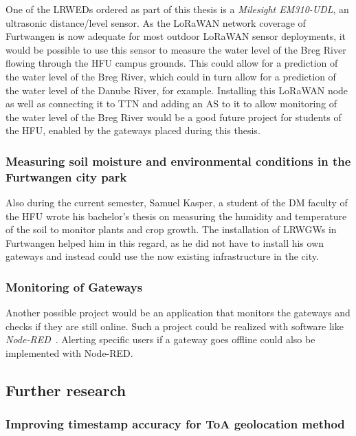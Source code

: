 One of the \aclp{LRWED} ordered as part of this thesis is a \emph{Milesight EM310-UDL}, an ultrasonic distance/level sensor.
As the \ac{LoRaWAN} network coverage of Furtwangen is now adequate for most outdoor \ac{LoRaWAN} sensor deployments, it would be possible to use this sensor to measure the water level of the Breg River flowing through the \ac{HFU} campus grounds.
This could allow for a prediction of the water level of the Breg River, which could in turn allow for a prediction of the water level of the Danube River, for example.
Installing this \ac{LoRaWAN} node as well as connecting it to \ac{TTN} and adding an \acf{AS} to it to allow monitoring of the water level of the Breg River would be a good future project for students of the \ac{HFU}, enabled by the gateways placed during this thesis.

\subsubsection{Measuring soil moisture and environmental conditions in the Furtwangen city park}

Also during the current semester, Samuel Kasper, a student of the \ac{DM} faculty of the \ac{HFU} wrote his bachelor's thesis on measuring the humidity and temperature of the soil to monitor plants and crop growth.
The installation of \aclp{LRWGW} in Furtwangen helped him in this regard, as he did not have to install his own gateways and instead could use the now existing infrastructure in the city.

\subsubsection{Monitoring of Gateways}

Another possible project would be an application that monitors the gateways and checks if they are still online.
Such a project could be realized with software like \emph{Node-RED}~\cite{openjs_foundation_node-red_nodate}.
Alerting specific users if a gateway goes offline could also be implemented with Node-RED.

\subsection{Further research}

\subsubsection{Improving timestamp accuracy for \acl{ToA} geolocation method}

